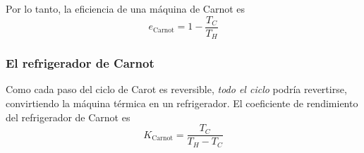 \documentclass[12pt]{article}
\begin{document}
  Por lo tanto, la eficiencia de una máquina de Carnot es 
  \[
  e_{\text{Carnot}} = 1 - \frac{T_{C}}{T_{H}}
  \]

  \subsubsection{El refrigerador de Carnot}
  Como cada paso del ciclo de Carot es reversible,  \textit{todo el ciclo} podría revertirse, convirtiendo la máquina térmica en un refrigerador. El coeficiente de rendimiento del refrigerador de Carnot es 
  \[
  K_{\text{Carnot}} = \frac{T_{C}}{T_{H}-T_{C}}
  \]

  



  
\end{document}
